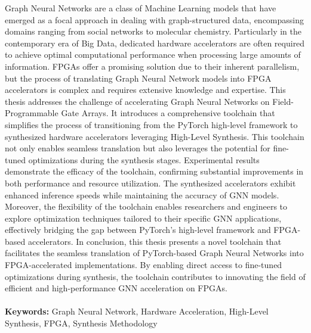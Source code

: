 Graph Neural Networks are a class of Machine Learning models that have emerged as a focal approach in dealing with graph-structured data, encompassing domains ranging from social networks to molecular chemistry.
Particularly in the contemporary era of Big Data, dedicated hardware accelerators are often required to achieve optimal computational performance when processing large amounts of information.
FPGAs offer a promising solution due to their inherent parallelism, but the process of translating Graph Neural Network models into FPGA accelerators is complex and requires extensive knowledge and expertise.
This thesis addresses the challenge of accelerating Graph Neural Networks on Field-Programmable Gate Arrays.
It introduces a comprehensive toolchain that simplifies the process of transitioning from the PyTorch high-level framework to synthesized hardware accelerators leveraging High-Level Synthesis.
This toolchain not only enables seamless translation but also leverages the potential for fine-tuned optimizations during the synthesis stages.
Experimental results demonstrate the efficacy of the toolchain, confirming substantial improvements in both performance and resource utilization.
The synthesized accelerators exhibit enhanced inference speeds while maintaining the accuracy of GNN models.
Moreover, the flexibility of the toolchain enables researchers and engineers to explore optimization techniques tailored to their specific GNN applications, effectively bridging the gap between PyTorch's high-level framework and FPGA-based accelerators.
In conclusion, this thesis presents a novel toolchain that facilitates the seamless translation of PyTorch-based Graph Neural Networks into FPGA-accelerated implementations.
By enabling direct access to fine-tuned optimizations during synthesis, the toolchain contributes to innovating the field of efficient and high-performance GNN acceleration on FPGAs.
\\
\\
\textbf{Keywords:} Graph Neural Network, Hardware Acceleration, High-Level Synthesis, FPGA, Synthesis Methodology %